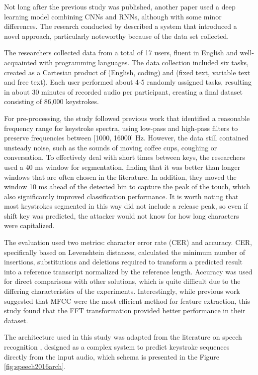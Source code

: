 \documentclass[a4paper,11pt,twoside]{report}
\theoremstyle{definition}
\begin{document}
Not long after the previous study was published, another paper used a deep learning model combining CNNs and RNNs, although with some minor differences. The research conducted by \textit{\cite{rnn2019}} described a system that introduced a novel approach, particularly noteworthy because of the data set collected.

The researchers collected data from a total of 17 users, fluent in English and well-acquainted with programming languages. The data collection included six tasks, created as a Cartesian product of (English, coding) and (fixed text, variable text and free text). Each user performed about 4-5 randomly assigned tasks, resulting in about 30 minutes of recorded audio per participant, creating a final dataset consisting of 86,000 keystrokes.

For pre-processing, the study followed previous work that identified a reasonable frequency range for keystroke spectra, using low-pass and high-pass filters to preserve frequencies between [1000, 16000] Hz. However, the data still contained unsteady noise, such as the sounds of moving coffee cups, coughing or conversation. To effectively deal with short times between keys, the researchers used a 40 ms window for segmentation, finding that it was better than longer windows that are often chosen in the literature. In addition, they moved the window 10 ms ahead of the detected bin to capture the peak of the touch, which also significantly improved classification performance. It is worth noting that most keystrokes segmented in this way did not include a release peak, so even if shift key was predicted, the attacker would not know for how long characters were capitalized.

The evaluation used two metrics: character error rate (CER) and accuracy. CER, specifically based on Levenshtein distances, calculated the minimum number of insertions, substitutions and deletions required to transform a predicted result into a reference transcript normalized by the reference length. Accuracy was used for direct comparisons with other solutions, which is quite difficult due to the differing characteristics of the experiments. Interestingly, while previous work suggested that MFCC were the most efficient method for feature extraction, this study found that the FFT transformation provided better performance in their dataset.

The architecture used in this study was adapted from the literature on speech recognition \cite{speech2016}, designed as a complex system to predict keystroke sequences directly from the input audio, which schema is presented in the Figure \ref{fig:speech2016arch}.
\end{document}
